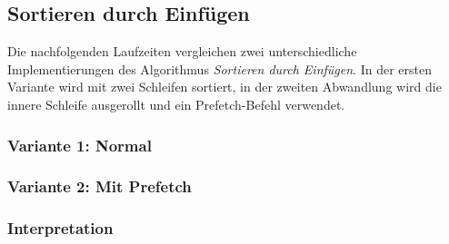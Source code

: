 \subsection{Sortieren durch Einfügen}

Die nachfolgenden Laufzeiten vergleichen zwei unterschiedliche Implementierungen des Algorithmus \textit{Sortieren durch Einfügen}. In der ersten Variante wird mit zwei Schleifen sortiert, in der zweiten Abwandlung wird die innere Schleife ausgerollt und ein Prefetch-Befehl verwendet.

\subsubsection{Variante 1: Normal}
\subsubsection{Variante 2: Mit Prefetch}
\subsubsection{Interpretation}
